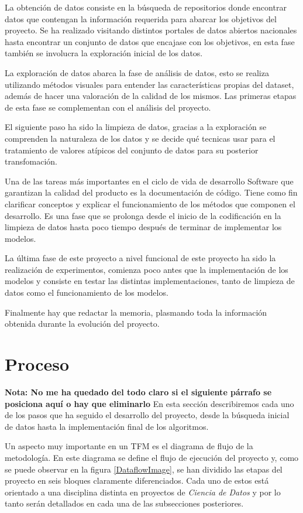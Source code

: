 La obtención de datos consiste en la búsqueda de repositorios donde encontrar datos que contengan la información requerida para abarcar los objetivos del proyecto. Se ha realizado visitando distintos portales de datos abiertos nacionales hasta encontrar un conjunto de datos que encajase con los objetivos, en esta fase también se involucra la exploración inicial de los datos.

La exploración de datos abarca la fase de análisis de datos, esto se realiza utilizando métodos visuales para entender las características propias del dataset, además de hacer una valoración de la calidad de los mismos. Las primeras etapas de esta fase se complementan con el análisis del proyecto.

El siguiente paso ha sido la limpieza de datos, gracias a la exploración se comprenden la naturaleza de los datos y se decide qué tecnicas usar para el tratamiento de valores atípicos del conjunto de datos para su posterior transfomación.

Una de las tareas más importantes en el ciclo de vida de desarrollo Software que garantizan la calidad del producto es la documentación de código. Tiene como fin
clarificar conceptos y explicar el funcionamiento de los métodos que componen el desarrollo. Es una fase que se prolonga desde el inicio de la codificación en la limpieza de datos hasta poco tiempo después de terminar de implementar los modelos.

La última fase de este proyecto a nivel funcional de este proyecto ha sido la realización de experimentos, comienza poco antes que la implementación de los modelos y consiste en testar las distintas implementaciones, tanto de limpieza de datos como el funcionamiento de los modelos.

Finalmente hay que redactar la memoria, plasmando toda la información obtenida durante la evolución del proyecto.



\section{Proceso}

    \textbf{Nota: No me ha quedado del todo claro si el siguiente párrafo se posiciona aquí o hay que eliminarlo}
    En esta sección describiremos cada uno de los pasos que ha seguido el desarrollo del proyecto, desde la búsqueda inicial de datos hasta la implementación final de los algoritmos.

    Un aspecto muy importante en un TFM es el diagrama de flujo de la metodología. En este diagrama se define el flujo de ejecución del proyecto y, como se puede observar en la figura \ref{DataflowImage}, se han dividido las etapas del proyecto en seis bloques claramente diferenciados. Cada uno de estos está orientado a una disciplina distinta en proyectos de \textit{Ciencia de Datos} y por lo tanto serán detallados en cada una de las subsecciones posteriores.


